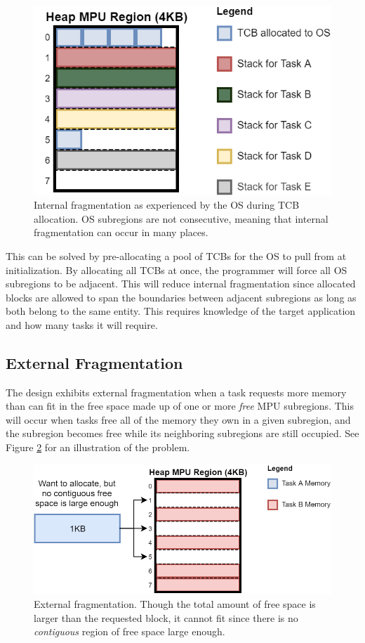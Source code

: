 \begin{figure}[hbtp]
	\centering
	\includegraphics[width=0.7\linewidth]{figs/OS_int_frag.png}
	\caption{Internal fragmentation as experienced by the OS during TCB allocation. OS subregions are not consecutive, meaning that internal fragmentation can occur in many places.}
	\label{fig:internal_frag}
\end{figure}

This can be solved by pre-allocating a pool of TCBs for the OS to pull from at initialization. By allocating all TCBs at once, the programmer will force all OS subregions to be adjacent. This will reduce internal fragmentation since allocated blocks are allowed to span the boundaries between adjacent subregions as long as both belong to the same entity. This requires knowledge of the target application and how many tasks it will require.

\subsection{External Fragmentation}

The design exhibits external fragmentation when a task requests more memory than can fit in the free space made up of one or more \textit{free} MPU subregions. This will occur when tasks free all of the memory they own in a given subregion, and the subregion becomes free while its neighboring subregions are still occupied. See Figure \ref{fig:external_frag} for an illustration of the problem.

\begin{figure}[hbtp]
	\centering
	\includegraphics[width=0.7\linewidth]{figs/ext_frag.png}
	\caption{External fragmentation. Though the total amount of free space is larger than the requested block, it cannot fit since there is no \textit{contiguous} region of free space large enough.}
	\label{fig:external_frag}
\end{figure}


